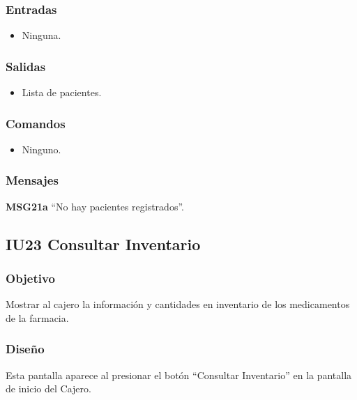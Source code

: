 \subsubsection{Entradas}
\begin{itemize}
	\item Ninguna.
\end{itemize}

\subsubsection{Salidas}
\begin{itemize}
	\item Lista de pacientes.
\end{itemize}

\subsubsection{Comandos}
\begin{itemize}
	\item Ninguno.
\end{itemize}

\subsubsection{Mensajes}
\begin{Citemize}
	\item {\bf MSG21a} ``No hay pacientes registrados''.
\end{Citemize}


\subsection{IU23 Consultar Inventario}

\subsubsection{Objetivo}
Mostrar al cajero la información y cantidades en inventario de los medicamentos de la farmacia.

\subsubsection{Diseño}
Esta pantalla aparece al presionar el botón ``Consultar Inventario'' en la pantalla de inicio del Cajero.

